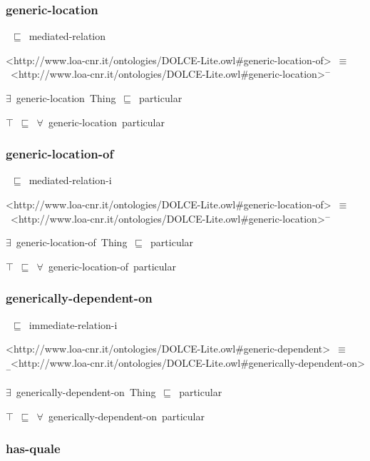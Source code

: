 \documentclass{article}
\begin{document}
\subsubsection*{generic-location}

~\ensuremath{\sqsubseteq}~mediated-relation

<http://www.loa-cnr.it/ontologies/DOLCE-Lite.owl#generic-location-of>~\ensuremath{\equiv}~<http://www.loa-cnr.it/ontologies/DOLCE-Lite.owl#generic-location>\ensuremath{^-}

\ensuremath{\exists}~generic-location~Thing~\ensuremath{\sqsubseteq}~particular

\ensuremath{\top}~\ensuremath{\sqsubseteq}~\ensuremath{\forall}~generic-location~particular

\subsubsection*{generic-location-of}

~\ensuremath{\sqsubseteq}~mediated-relation-i

<http://www.loa-cnr.it/ontologies/DOLCE-Lite.owl#generic-location-of>~\ensuremath{\equiv}~<http://www.loa-cnr.it/ontologies/DOLCE-Lite.owl#generic-location>\ensuremath{^-}

\ensuremath{\exists}~generic-location-of~Thing~\ensuremath{\sqsubseteq}~particular

\ensuremath{\top}~\ensuremath{\sqsubseteq}~\ensuremath{\forall}~generic-location-of~particular

\subsubsection*{generically-dependent-on}

~\ensuremath{\sqsubseteq}~immediate-relation-i

<http://www.loa-cnr.it/ontologies/DOLCE-Lite.owl#generic-dependent>~\ensuremath{\equiv}~<http://www.loa-cnr.it/ontologies/DOLCE-Lite.owl#generically-dependent-on>\ensuremath{^-}

\ensuremath{\exists}~generically-dependent-on~Thing~\ensuremath{\sqsubseteq}~particular

\ensuremath{\top}~\ensuremath{\sqsubseteq}~\ensuremath{\forall}~generically-dependent-on~particular

\subsubsection*{has-quale}
\end{document}
